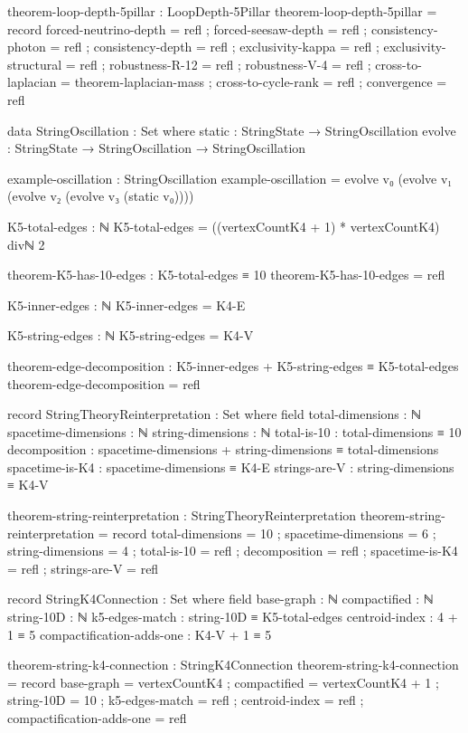 \documentclass[11pt,a4paper]{book}
\begin{document}
\begin{code}
theorem-loop-depth-5pillar : LoopDepth-5Pillar
theorem-loop-depth-5pillar = record
  { forced-neutrino-depth = refl
  ; forced-seesaw-depth   = refl
  ; consistency-photon    = refl
  ; consistency-depth     = refl
  ; exclusivity-kappa     = refl
  ; exclusivity-structural = refl
  ; robustness-R-12       = refl
  ; robustness-V-4        = refl
  ; cross-to-laplacian    = theorem-laplacian-mass
  ; cross-to-cycle-rank   = refl
  ; convergence           = refl
  }

data StringOscillation : Set where
  static : StringState → StringOscillation
  evolve : StringState → StringOscillation → StringOscillation

example-oscillation : StringOscillation
example-oscillation = evolve v₀ (evolve v₁ (evolve v₂ (evolve v₃ (static v₀))))

K5-total-edges : ℕ
K5-total-edges = ((vertexCountK4 + 1) * vertexCountK4) divℕ 2

theorem-K5-has-10-edges : K5-total-edges ≡ 10
theorem-K5-has-10-edges = refl

K5-inner-edges : ℕ
K5-inner-edges = K4-E

K5-string-edges : ℕ
K5-string-edges = K4-V

theorem-edge-decomposition : K5-inner-edges + K5-string-edges ≡ K5-total-edges
theorem-edge-decomposition = refl

record StringTheoryReinterpretation : Set where
  field
    total-dimensions : ℕ
    spacetime-dimensions : ℕ
    string-dimensions : ℕ
    total-is-10 : total-dimensions ≡ 10
    decomposition : spacetime-dimensions + string-dimensions ≡ total-dimensions
    spacetime-is-K4 : spacetime-dimensions ≡ K4-E
    strings-are-V : string-dimensions ≡ K4-V

theorem-string-reinterpretation : StringTheoryReinterpretation
theorem-string-reinterpretation = record
  { total-dimensions = 10
  ; spacetime-dimensions = 6
  ; string-dimensions = 4
  ; total-is-10 = refl
  ; decomposition = refl
  ; spacetime-is-K4 = refl
  ; strings-are-V = refl
  }

record StringK4Connection : Set where
  field
    base-graph : ℕ
    compactified : ℕ
    string-10D : ℕ
    k5-edges-match : string-10D ≡ K5-total-edges
    centroid-index : 4 + 1 ≡ 5
    compactification-adds-one : K4-V + 1 ≡ 5

theorem-string-k4-connection : StringK4Connection
theorem-string-k4-connection = record
  { base-graph = vertexCountK4
  ; compactified = vertexCountK4 + 1
  ; string-10D = 10
  ; k5-edges-match = refl
  ; centroid-index = refl
  ; compactification-adds-one = refl
  }


\end{code}
\end{document}
